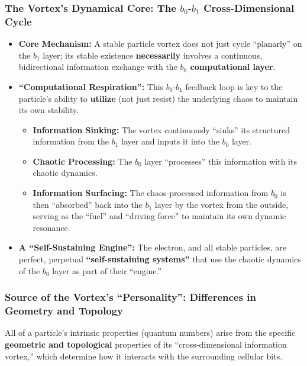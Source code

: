 \documentclass[11pt, a4paper]{article}
\begin{document}
\subsubsection{The Vortex's Dynamical Core: The $b_0$-$b_1$ Cross-Dimensional Cycle}
\begin{itemize}
    \item \textbf{Core Mechanism:} A stable particle vortex does not just cycle ``planarly'' on the $b_1$ layer; its stable existence \textbf{necessarily} involves a continuous, bidirectional information exchange with the \textbf{$b_0$ computational layer}.
    \item \textbf{``Computational Respiration'':} This $b_0$-$b_1$ feedback loop is key to the particle's ability to \textbf{utilize} (not just resist) the underlying chaos to maintain its own stability.
    \begin{itemize}
        \item \textbf{Information Sinking:} The vortex continuously ``sinks'' its structured information from the $b_1$ layer and inputs it into the $b_0$ layer.
        \item \textbf{Chaotic Processing:} The $b_0$ layer ``processes'' this information with its chaotic dynamics.
        \item \textbf{Information Surfacing:} The chaos-processed information from $b_0$ is then ``absorbed'' back into the $b_1$ layer by the vortex from the outside, serving as the ``fuel'' and ``driving force'' to maintain its own dynamic resonance.
    \end{itemize}
    \item \textbf{A ``Self-Sustaining Engine'':} The electron, and all stable particles, are perfect, perpetual \textbf{``self-sustaining systems''} that use the chaotic dynamics of the $b_0$ layer as part of their ``engine.''
\end{itemize}

\subsubsection{Source of the Vortex's ``Personality'': Differences in Geometry and Topology}
All of a particle's intrinsic properties (quantum numbers) arise from the specific \textbf{geometric and topological} properties of its ``cross-dimensional information vortex,'' which determine how it interacts with the surrounding cellular bits.
\end{document}
